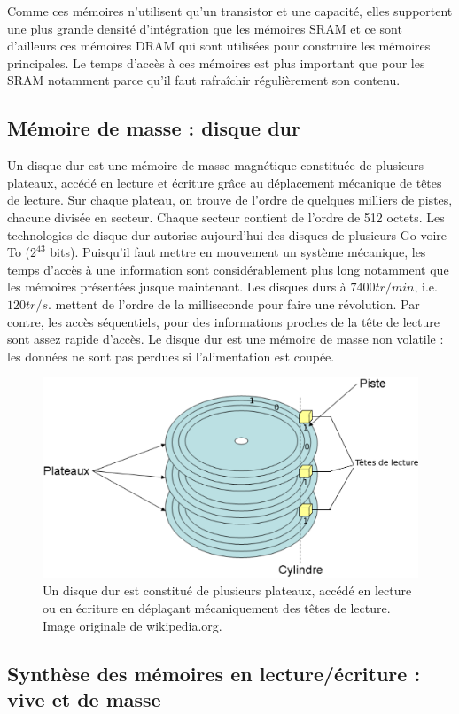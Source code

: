 Comme ces mémoires n'utilisent qu'un transistor et une capacité, elles supportent une plus grande densité d'intégration que les mémoires SRAM et ce sont d'ailleurs ces mémoires DRAM qui sont utilisées pour construire les mémoires principales. Le temps d'accès à ces mémoires est plus important que pour les SRAM notamment parce qu'il faut rafraîchir régulièrement son contenu.


\subsection{Mémoire de masse : disque dur}

Un disque dur est une mémoire de masse magnétique constituée de plusieurs plateaux, accédé en lecture et écriture grâce au déplacement mécanique de têtes de lecture. Sur chaque plateau, on trouve de l'ordre de quelques milliers de pistes, chacune divisée en secteur. Chaque secteur contient de l'ordre de 512 octets. Les technologies de disque dur autorise aujourd'hui des disques de plusieurs Go voire To ($2^{43}$ bits). Puisqu'il faut mettre en mouvement un système mécanique, les temps d'accès à une information sont considérablement plus long notamment que les mémoires présentées jusque maintenant. Les disques durs à $7400 tr/min$, i.e. $120 tr/s.$ mettent de l'ordre de la milliseconde pour faire une révolution. Par contre, les accès séquentiels, pour des informations proches de la tête de lecture sont assez rapide d'accès. Le disque dur est une mémoire de masse non volatile : les données ne sont pas perdues si l'alimentation est coupée.

\begin{figure}[htbp]
\centering\includegraphics[width=0.5\linewidth]{Figs/dd.pdf}
\caption{\label{fig:mem_dd} Un disque dur est constitué de plusieurs plateaux, accédé en lecture ou en écriture en déplaçant mécaniquement des têtes de lecture. Image originale de wikipedia.org.}
\end{figure}

\subsection{Synthèse des mémoires en lecture/écriture : vive et de masse}

